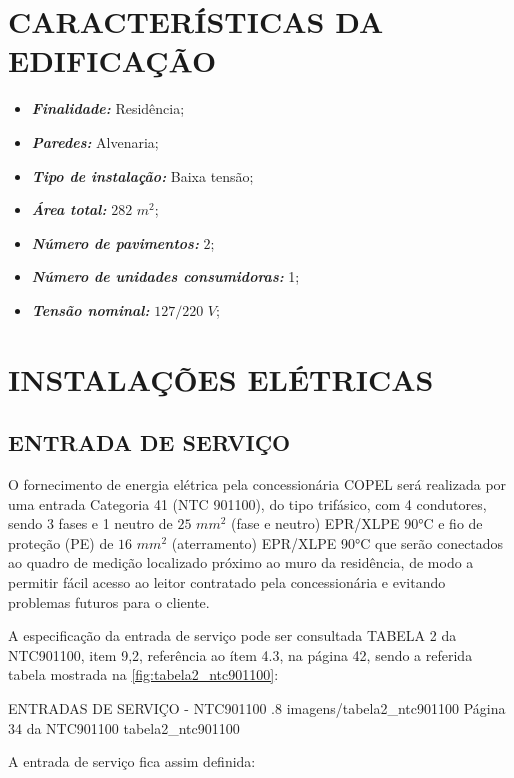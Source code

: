 \section{CARACTERÍSTICAS DA EDIFICAÇÃO}
\begin{itemize}
	\item \textbf{\textit{Finalidade:}} Residência;
	\item \textbf{\textit{Paredes:}} Alvenaria;
	\item \textbf{\textit{Tipo de instalação:}} Baixa tensão;
	\item \textbf{\textit{Área total:}} $282$ $m^2$;
	\item \textbf{\textit{Número de pavimentos:}} $2$;
	\item \textbf{\textit{Número de unidades consumidoras:}} 1;
	\item \textbf{\textit{Tensão nominal:}} $127/220$ $V$;
\end{itemize}

\section{INSTALAÇÕES ELÉTRICAS}

\subsection{ENTRADA DE SERVIÇO}

O fornecimento de energia elétrica pela concessionária COPEL será realizada por uma entrada Categoria 41 (NTC 901100), do tipo trifásico, com 4 condutores, sendo 3 fases e 1 neutro de $25$ $mm^2$ (fase e neutro) EPR/XLPE 90°C e fio de proteção (PE) de $16$ $mm^2$ (aterramento) EPR/XLPE 90°C que serão conectados ao quadro de medição localizado próximo ao muro da residência, de modo a permitir fácil acesso ao leitor contratado pela concessionária e evitando problemas futuros para o cliente.

A especificação da entrada de serviço pode ser consultada TABELA 2 da NTC901100, item 9,2, referência ao ítem 4.3, na página 42, sendo a referida tabela mostrada na \autoref{fig:tabela2_ntc901100}:

\pagebreak

\figura
{ENTRADAS DE SERVIÇO - NTC901100} %
{.8} %
{imagens/tabela2_ntc901100} %
{Página 34 da NTC901100} %
{tabela2_ntc901100} %
{}
{}

A entrada de serviço fica assim definida:

